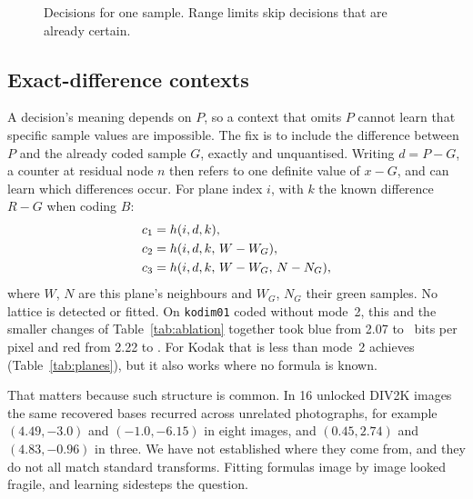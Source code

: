 \documentclass[10pt,twocolumn]{article}
\begin{document}
\begin{figure}[t]
\centering
{}
\caption{Decisions for one sample. Range limits skip decisions that are already certain.}
\label{fig:tree}
\end{figure}

\subsection{Exact-difference contexts}
\label{sec:exact}

A decision's meaning depends on $P$, so a context that omits $P$ cannot learn that specific sample values are impossible. The fix is to include the difference between $P$ and the already coded sample $G$, exactly and unquantised. Writing $d=P-G$, a counter at residual node $n$ then refers to one definite value of $x-G$, and can learn which differences occur. For plane index $i$, with $k$ the known difference $R-G$ when coding $B$:
\begin{align}
c_{1}&=h(i,d,k),\notag\\
c_{2}&=h(i,d,k,\,W-W_G),\notag\\
c_{3}&=h(i,d,k,\,W-W_G,\,N-N_G),
\end{align}
where $W$, $N$ are this plane's neighbours and $W_G$, $N_G$ their green samples. No lattice is detected or fitted. On \texttt{kodim01} coded without mode~2, this and the smaller changes of Table~\ref{tab:ablation} together took blue from 2.07 to \plaz\ bits per pixel and red from 2.22 to \plax. For Kodak that is less than mode~2 achieves (Table~\ref{tab:planes}), but it also works where no formula is known.

That matters because such structure is common. In 16 unlocked DIV2K images the same recovered bases recurred across unrelated photographs, for example $(4.49,-3.0)$ and $(-1.0,-6.15)$ in eight images, and $(0.45,2.74)$ and $(4.83,-0.96)$ in three. We have not established where they come from, and they do not all match standard transforms. Fitting formulas image by image looked fragile, and learning sidesteps the question.
\end{document}
